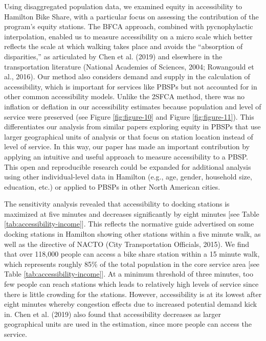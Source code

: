 \documentclass[]{elsarticle} %
\begin{document}
Using disaggregated population data, we examined equity in accessibility
to Hamilton Bike Share, with a particular focus on assessing the
contribution of the program's equity stations. The BFCA approach,
combined with pycnophylactic interpolation, enabled us to measure
accessibility on a micro scale which better reflects the scale at which
walking takes place and avoids the ``absorption of disparities,'' as
articulated by Chen et al. (2019) and elsewhere in the transportation
literature (National Academies of Sciences, 2004; Rowangould et al.,
2016). Our method also considers demand and supply in the calculation of
accessibility, which is important for services like PBSPs but not
accounted for in other common accessibility models. Unlike the 2SFCA
method, there was no inflation or deflation in our accessibility
estimates because population and level of service were preserved (see
Figure \ref{fig:figure-10} and Figure \ref{fig:figure-11}). This
differentiates our analysis from similar papers exploring equity in
PBSPs that use larger geographical units of analysis or that focus on
station location instead of level of service. In this way, our paper has
made an important contribution by applying an intuitive and useful
approach to measure accessibility to a PBSP. This open and reproducible
research could be expanded for additional analysis using other
individual-level data in Hamilton (e.g., age, gender, household size,
education, etc.) or applied to PBSPs in other North American cities.

The sensitivity analysis revealed that accessibility to docking stations
is maximized at five minutes and decreases significantly by eight
minutes {[}see Table \ref{tab:accessibility-income}{]}. This reflects
the normative guide advertised on some docking stations in Hamilton
showing other stations within a five minute walk, as well as the
directive of NACTO (City Transportation Officials, 2015). We find that
over 118,000 people can access a bike share station within a 15 minute
walk, which represents roughly 85\% of the total population in the core
service area {[}see Table \ref{tab:accessibility-income}{]}. At a
minimum threshold of three minutes, too few people can reach stations
which leads to relatively high levels of service since there is little
crowding for the stations. However, accessibility is at its lowest after
eight minutes whereby congestion effects due to increased potential
demand kick in. Chen et al. (2019) also found that accessibility
decreases as larger geographical units are used in the estimation, since
more people can access the service.
\end{document}
